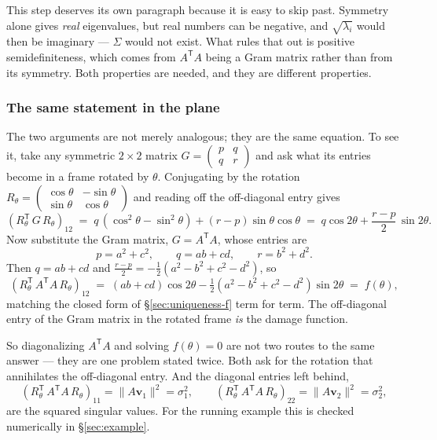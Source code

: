 \documentclass[11pt]{article}
\numberwithin{equation}{section}
\newcommand{\T}{^{\mathsf{T}}}
\newcommand{\vv}[1]{\mathbf{v}_{#1}}
\theoremstyle{plainish}
\begin{document}
This step deserves its own paragraph because it is easy to skip past. Symmetry
alone gives \emph{real} eigenvalues, but real numbers can be negative, and
$\sqrt{\lambda_i}$ would then be imaginary --- $\Sigma$ would not exist. What
rules that out is positive semidefiniteness, which comes from $A\T A$ being a
Gram matrix rather than from its symmetry. Both properties are needed, and they
are different properties.

\subsubsection*{The same statement in the plane}

The two arguments are not merely analogous; they are the same equation. To see
it, take any symmetric $2\times 2$ matrix $G = \left(\begin{smallmatrix} p & q \\ q & r\end{smallmatrix}\right)$
and ask what its entries become in a frame rotated by $\theta$. Conjugating by
the rotation $R_\theta = \left(\begin{smallmatrix} \cos\theta & -\sin\theta \\ \sin\theta & \cos\theta \end{smallmatrix}\right)$
and reading off the off-diagonal entry gives
\begin{equation}\left(R_\theta\T\, G\, R_\theta\right)_{12}
\;=\; q\,(\cos^2\theta - \sin^2\theta) + (r - p)\sin\theta\cos\theta
\;=\; q \cos 2\theta + \frac{r-p}{2}\,\sin 2\theta .
\end{equation}
Now substitute the Gram matrix, $G = A\T A$, whose entries are
\begin{equation}p = a^2 + c^2, \qquad q = ab + cd, \qquad r = b^2 + d^2 .
\end{equation}
Then $q = ab+cd$ and $\tfrac{r-p}{2} = -\tfrac12(a^2 - b^2 + c^2 - d^2)$, so
\begin{equation}\left(R_\theta\T\, A\T A\, R_\theta\right)_{12}
\;=\; (ab+cd)\cos 2\theta - \tfrac12\left(a^2 - b^2 + c^2 - d^2\right)\sin 2\theta
\;=\; f(\theta),
\end{equation}
matching the closed form of \S\ref{sec:uniqueness-f} term for term. The
off-diagonal entry of the Gram matrix in the rotated frame \emph{is} the damage
function.

So diagonalizing $A\T A$ and solving $f(\theta) = 0$ are not two routes to the
same answer --- they are one problem stated twice. Both ask for the rotation
that annihilates the off-diagonal entry. And the diagonal entries left behind,
\begin{equation}\left(R_\theta\T\, A\T A\, R_\theta\right)_{11} = \|A\vv1\|^2 = \sigma_1^2,
\qquad
\left(R_\theta\T\, A\T A\, R_\theta\right)_{22} = \|A\vv2\|^2 = \sigma_2^2,
\end{equation}
are the squared singular values. For the running example this is checked
numerically in \S\ref{sec:example}.
\end{document}
